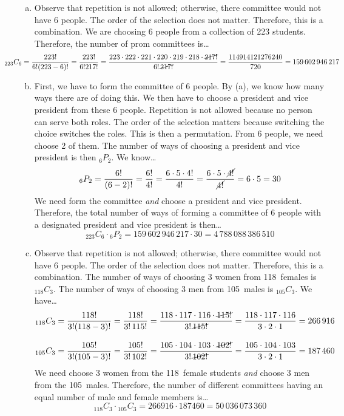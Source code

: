\documentclass[11pt,letterpaper]{article}
\begin{document}
\sol 
\begin{enumerate}[(a)]
\item Observe that repetition is not allowed; otherwise, there committee would not have 6 people. The order of the selection does not matter. Therefore, this is a combination. We are choosing 6 people from a collection of 223 students. Therefore, the number of prom committees is\dots
	\[
	\hspace{-1.5cm} _{223}C_6= \dfrac{223!}{6! (223 - 6)!}= \dfrac{223!}{6! 217!}= \dfrac{223 \cdot 222 \cdot 221 \cdot 220 \cdot 219 \cdot 218 \cdot \cancel{217!}}{6!\, \cancel{217!}}= \dfrac{114914121276240}{720}= 159\,602\,946\,217
	\] \pspace

\item First, we have to form the committee of 6 people. By (a), we know how many ways there are of doing this. We then have to choose a president and vice president from these 6 people. Repetition is not allowed because no person can serve both roles. The order of the selection matters because switching the choice switches the roles. This is then a permutation. From 6 people, we need choose 2 of them. The number of ways of choosing a president and vice president is then $_6P_2$. We know\dots
	\[
	_6P_2= \dfrac{6!}{(6 - 2)!}= \dfrac{6!}{4!}= \dfrac{6 \cdot 5 \cdot 4!}{4!}= \dfrac{6 \cdot 5 \cdot \cancel{4!}}{\cancel{4!}}= 6 \cdot 5= 30
	\]
We need form the committee \textit{and} choose a president and vice president. Therefore, the total number of ways of forming a committee of 6 people with a designated president and vice president is then\dots
	\[
	_{223}C_6 \cdot {}_6P_2= 159\,602\,946\,217 \cdot 30= 4\,788\,088\,386\,510
	\] \pspace

\item Observe that repetition is not allowed; otherwise, there committee would not have 6 people. The order of the selection does not matter. Therefore, this is a combination. The number of ways of choosing 3 women from 118~females is $_{118}C_3$. The number of ways of choosing 3 men from 105~males is $_{105}C_3$. We have\dots
	\[
	\begin{aligned}
	_{118}C_3&= \dfrac{118!}{3! (118 - 3)!}= \dfrac{118!}{3! \,115!}= \dfrac{118 \cdot 117 \cdot 116 \cdot \cancel{115!}}{3! \, \cancel{115!}}= \dfrac{118 \cdot 117 \cdot 116}{3 \cdot 2 \cdot 1}= 266\,916 \\[0.3cm]
	_{105}C_3&= \dfrac{105!}{3! (105 - 3)!}= \dfrac{105!}{3! \,102!}= \dfrac{105 \cdot 104 \cdot 103 \cdot \cancel{102!}}{3! \,\cancel{102!}}= \dfrac{105 \cdot 104 \cdot 103}{3 \cdot 2 \cdot 1}= 187\,460
	\end{aligned}
	\]
We need choose 3 women from the 118~female students \textit{and} choose 3 men from the 105~males. Therefore, the number of different committees having an equal number of male and female members is\dots
	\[
	_{118}C_3 \cdot {}_{105}C_3= 266916 \cdot 187460= 50\,036\,073\,360
	\]
\end{enumerate}
\end{document}
